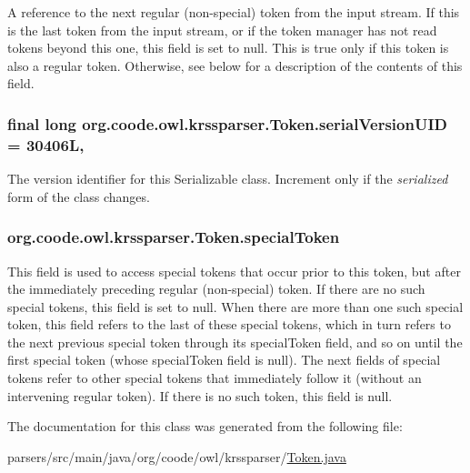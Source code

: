 A reference to the next regular (non-\/special) token from the input stream. If this is the last token from the input stream, or if the token manager has not read tokens beyond this one, this field is set to null. This is true only if this token is also a regular token. Otherwise, see below for a description of the contents of this field. \hypertarget{classorg_1_1coode_1_1owl_1_1krssparser_1_1_token_a2d0cb44180caa3616374431edcbcad74}{
\subsubsection[{serial\-Version\-U\-I\-D}]{\setlength{\rightskip}{0pt plus 5cm}final long org.\-coode.\-owl.\-krssparser.\-Token.\-serial\-Version\-U\-I\-D = 30406\-L\hspace{0.3cm}{\ttfamily [static]}, {\ttfamily [private]}}}\label{classorg_1_1coode_1_1owl_1_1krssparser_1_1_token_a2d0cb44180caa3616374431edcbcad74}
The version identifier for this Serializable class. Increment only if the {\itshape serialized} form of the class changes. \hypertarget{classorg_1_1coode_1_1owl_1_1krssparser_1_1_token_a493670086a75f3be86160e2e7a0689d3}{
\subsubsection[{special\-Token}]{ org.\-coode.\-owl.\-krssparser.\-Token.\-special\-Token}}\label{classorg_1_1coode_1_1owl_1_1krssparser_1_1_token_a493670086a75f3be86160e2e7a0689d3}
This field is used to access special tokens that occur prior to this token, but after the immediately preceding regular (non-\/special) token. If there are no such special tokens, this field is set to null. When there are more than one such special token, this field refers to the last of these special tokens, which in turn refers to the next previous special token through its special\-Token field, and so on until the first special token (whose special\-Token field is null). The next fields of special tokens refer to other special tokens that immediately follow it (without an intervening regular token). If there is no such token, this field is null. 

The documentation for this class was generated from the following file\-:\begin{DoxyCompactItemize}
\item 
parsers/src/main/java/org/coode/owl/krssparser/\hyperlink{org_2coode_2owl_2krssparser_2_token_8java}{Token.\-java}\end{DoxyCompactItemize}
